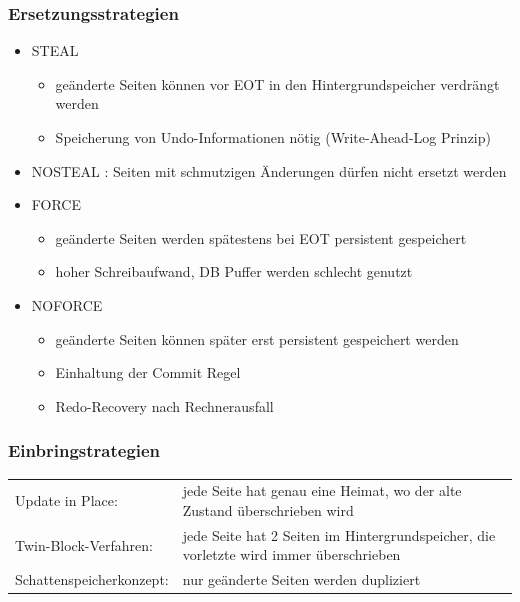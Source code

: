 \documentclass[a4paper]{article}
\begin{document}
    \subsubsection{Ersetzungsstrategien}
    \begin{itemize}
        \item STEAL
        
        \begin{itemize}
            \item geänderte Seiten können vor EOT in den Hintergrundspeicher verdrängt werden
            \item Speicherung von Undo-Informationen nötig (Write-Ahead-Log Prinzip)
        \end{itemize}
        
        \item NOSTEAL : Seiten mit schmutzigen Änderungen dürfen nicht ersetzt werden
    
        
        \item FORCE
        
        \begin{itemize}
            \item geänderte Seiten werden spätestens bei EOT persistent gespeichert
            \item hoher Schreibaufwand, DB Puffer werden schlecht genutzt
        \end{itemize}
        
        \item NOFORCE
        
        \begin{itemize}
            \item geänderte Seiten können später erst persistent gespeichert werden
            \item Einhaltung der Commit Regel
            \item Redo-Recovery nach Rechnerausfall
        \end{itemize}
    \end{itemize}

    \subsubsection{Einbringstrategien}
    \begin{tabular}{l p{11cm}}
         Update in Place: & jede Seite hat genau eine Heimat, wo der alte Zustand überschrieben wird \\
         Twin-Block-Verfahren: & jede Seite hat 2 Seiten im Hintergrundspeicher, die vorletzte wird immer überschrieben\\
         Schattenspeicherkonzept: & nur geänderte Seiten werden dupliziert
    \end{tabular}
    
\end{document}
